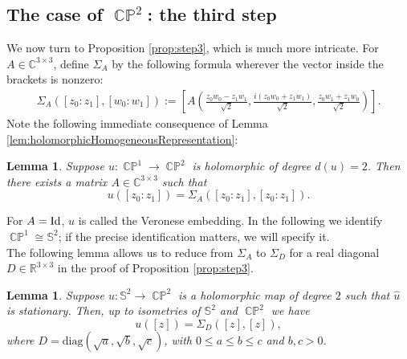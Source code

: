 \documentclass[11pt]{article}
\theoremstyle{plain}
\numberwithin{equation}{section}
\newtheorem{lemma}[theorem]{Lemma}
\theoremstyle{definition}
\def \C{\mathbb{C}}
\def \mb{\mathbb}
\def \Id{\textup{Id}}
\DeclareMathOperator{\CP}{\mathbb{CP}}
\begin{document}
\subsection{The case of \texorpdfstring{$\CP^2$}{CP2}: the third step}
We now turn to Proposition \ref{prop:step3}, which is much more intricate.  For $A \in \C^{3\times 3}$, define $\Sigma_A$ by the following formula wherever the vector inside the brackets is nonzero:
\begin{gather*}
\Sigma_A([z_0:z_1],[w_0:w_1])
:=
\left[
A\left(
\frac{z_0w_0-z_1w_1}{\sqrt{2}},
\frac{i(z_0w_0+z_1w_1)}{\sqrt{2}},
\frac{z_0w_1+z_1w_0}{\sqrt{2}}
\right)
\right].
\end{gather*}
Note the following immediate consequence of Lemma \ref{lem:holomorphicHomogeneousRepresentation}:

\begin{lemma}
    \label{lemma:VeroneseStandardForm}
    Suppose $u:\CP^1 \to \CP^2$ is holomorphic of degree $d(u)=2$. Then there exists a matrix $A \in \C^{3\times 3}$ such that
    \[
    u([z_0:z_1])=\Sigma_A([z_0:z_1],[z_0:z_1]).
    \]
\end{lemma}

For $A=\Id$, $u$ is called the Veronese embedding. In the following we identify $\CP^1 \cong \mb S^2$; if the precise identification matters, we will specify it.\\
The following lemma allows us to reduce from $\Sigma_A$ to $\Sigma_D$ for a real diagonal $D \in \mb R^{3\times 3}$ in the proof of Proposition \ref{prop:step3}.
\begin{lemma}
    \label{lem:StationarityCPDeg2}
    Suppose $u:\mb S^2 \to \CP^2$ is a holomorphic map of degree $2$ such that $\hat u$ is stationary. Then, up to isometries of $\mb S^2$ and $\CP^2$ we have
    \[
    u([z])=\Sigma_D([z],[z]),
    \]
    where $D=\mathrm{diag}(\sqrt{a},\sqrt{b},\sqrt{c})$, with $0\leq a \leq b\leq c$ and $b,c>0$.
\end{lemma}
\end{document}
